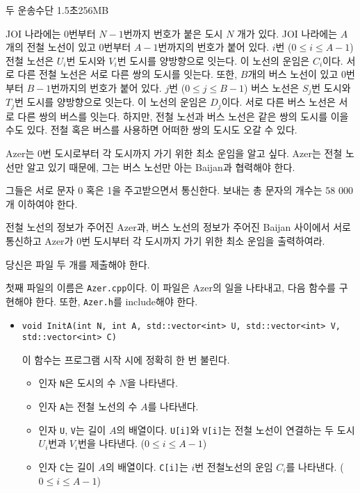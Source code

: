 \begin{problem}{두 운송수단}
	{}{}
	{1.5초}{256MB}{}
	
	JOI 나라에는 0번부터 $N-1$번까지 번호가 붙은 도시 $N$ 개가 있다. JOI 나라에는 $A$ 개의 전철 노선이 있고 0번부터 $A-1$번까지의 번호가 붙어 있다. $i$번 ($0 \le i \le A-1$) 전철 노선은 $U_i$번 도시와 $V_i$번 도시를 양방향으로 잇는다. 이 노선의 운임은 $C_i$이다. 서로 다른 전철 노선은 서로 다른 쌍의 도시를 잇는다.
	또한, $B$개의 버스 노선이 있고 0번부터 $B-1$번까지의 번호가 붙어 있다. $j$번 ($0 \le j\le B-1$) 버스 노선은 $S_j$번 도시와 $T_j$번 도시를 양방향으로 잇는다. 이 노선의 운임은 $D_j$이다. 서로 다른 버스 노선은 서로 다른 쌍의 버스를 잇는다. 하지만, 전철 노선과 버스 노선은 같은 쌍의 도시를 이을 수도 있다. 전철 혹은 버스를 사용하면 어떠한 쌍의 도시도 오갈 수 있다.
	
	Azer는 0번 도시로부터 각 도시까지 가기 위한 최소 운임을 알고 싶다. Azer는 전철 노선만 알고 있기 때문에, 그는 버스 노선만 아는 Baijan과 협력해야 한다.
	
	그들은 서로 문자 0 혹은 1을 주고받으면서 통신한다. 보내는 총 문자의 개수는 58 000개 이하여야 한다.
	
	전철 노선의 정보가 주어진 Azer과, 버스 노선의 정보가 주어진 Baijan 사이에서 서로 통신하고 Azer가 0번 도시부터 각 도시까지 가기 위한 최소 운임을 출력하여라.
	
	\Specification
	
	당신은 파일 두 개를 제출해야 한다.
	
	첫째 파일의 이름은 \texttt{Azer.cpp}이다. 이 파일은 Azer의 일을 나타내고, 다음 함수를 구현해야 한다. 또한, \texttt{Azer.h}를 include해야 한다.

	\begin{itemize}
		\item \texttt{void InitA(int N, int A, std::vector<int> U, std::vector<int> V, std::vector<int> C)}
		
		이 함수는 프로그램 시작 시에 정확히 한 번 불린다.
		\begin{itemize}
			\item 인자 \texttt{N}은 도시의 수 $N$을 나타낸다.
			\item 인자 \texttt{A}는 전철 노선의 수 $A$를 나타낸다.
			\item 인자 \texttt{U}, \texttt{V}는 길이 $A$의 배열이다. \texttt{U[i]}와 \texttt{V[i]}는 전철 노선이 연결하는 두 도시 $U_i$번과 $V_i$번을 나타낸다. ($0 \le i \le A-1$)
			\item 인자 \texttt{C}는 길이 $A$의 배열이다. \texttt{C[i]}는 $i$번 전철노선의 운임 $C_i$를 나타낸다. ($0 \le i \le A-1$)
		\end{itemize}
		

\end{itemize}
\end{problem}
